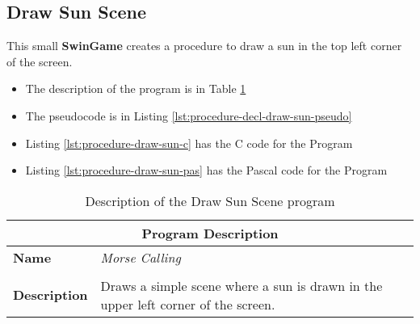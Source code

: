

\clearpage
\subsection{Draw Sun Scene} %
\label{sub:draw_sun}

This small \textbf{SwinGame} creates a procedure to draw a sun in the top left corner of the screen.
\begin{itemize}
  \item The description of the program is in Table \ref{tbl:procedure-decl-draw-sun}
  \item The pseudocode is in Listing \ref{lst:procedure-decl-draw-sun-pseudo}
  \item Listing \ref{lst:procedure-draw-sun-c} has the C code for the Program
  \item Listing \ref{lst:procedure-draw-sun-pas} has the Pascal code for the Program
\end{itemize}

\begin{table}[h]
\centering
\begin{tabular}{l|p{10cm}}
  \hline
  \multicolumn{2}{c}{\textbf{Program Description}} \\
  \hline
  \textbf{Name} & \emph{Morse Calling} \\
  \\
  \textbf{Description} & Draws a simple scene where a sun is drawn in the upper left corner of the screen. \\
  \hline
\end{tabular}
\caption{Description of the Draw Sun Scene program}
\label{tbl:procedure-decl-draw-sun}
\end{table}

